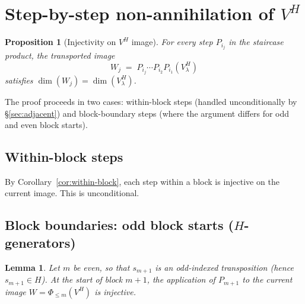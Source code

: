 \documentclass[11pt]{article}
\newtheorem{lemma}[theorem]{Lemma}
\newtheorem{proposition}[theorem]{Proposition}
\theoremstyle{definition}
\theoremstyle{remark}
\begin{document}
\section{Step-by-step non-annihilation of $V^H$}\label{sec:non-annihilation}

\begin{proposition}[Injectivity on $V^H$ image]\label{prop:injectivity}
For every step $P_{i_j}$ in the staircase product, the transported
image
\[
  W_j \;=\; P_{i_j} \cdots P_{i_2} P_{i_1}(V_\lambda^H)
\]
satisfies $\dim(W_j) = \dim(V_\lambda^H)$.
\end{proposition}

The proof proceeds in two cases: within-block steps (handled
unconditionally by \S\ref{sec:adjacent}) and block-boundary steps
(where the argument differs for odd and even block starts).

\subsection{Within-block steps}

By Corollary~\ref{cor:within-block}, each step within a block
is injective on the current image. This is unconditional.

\subsection{Block boundaries: odd block starts ($H$-generators)}

\begin{lemma}\label{lem:odd-boundary}
Let $m$ be even, so that $s_{m+1}$ is an odd-indexed transposition
(hence $s_{m+1} \in H$). At the start of block $m{+}1$, the
application of $P_{m+1}$ to the current image $W = \Phi_{\le m}(V^H)$
is injective.
\end{lemma}
\end{document}
